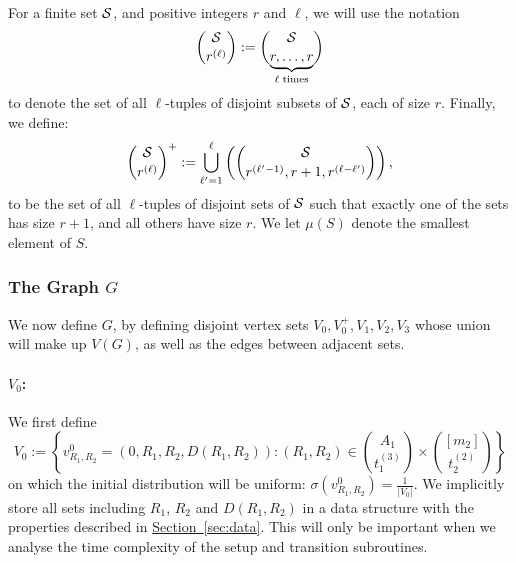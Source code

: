 \documentclass{theoretics}
\renewcommand{\sec}[1]{\hyperref[sec:#1]{Section~\ref*{sec:#1}}}
\renewcommand{\>}{\rangle}
\newcommand{\<}{\langle}
\renewcommand{\(}{\left(}
\renewcommand{\)}{\right)}
\begin{document}
For a finite set ${\cal S}$, and positive integers $r$ and $\ell$, we will use the notation 
\begin{equation}
\binom{{\cal S}}{r^{(\ell)}}:=\binom{{\cal S}}{\underbrace{r,\dots,r}_{\ell\;\mathrm{times}}}\label{eq:weird-binom}
\end{equation}
to denote the set of all $\ell$-tuples of disjoint subsets of ${\cal S}$, each of size $r$. 
Finally, we define:
\begin{equation}
{\binom{\cal S}{r^{(\ell)}}^+} := \bigcup_{\ell'=1}^{\ell} \left(\binom{\cal S}{r^{(\ell'-1)},r+1,r^{(\ell-\ell')}}\right),\label{eq:weird-binom+}
\end{equation}
to be the set of all $\ell$-tuples of disjoint sets of ${\cal S}$ such that exactly one of the sets has size $r+1$, and all others have size $r$. We let $\mu(S)$ denote the smallest element of $S$.

\subsubsection{The Graph \texorpdfstring{$G$}{G}}\label{sec:3-dist-G}

We now define $G$, by defining disjoint vertex sets $V_0,V_0^+,V_1,V_2,V_3$ whose union will make up $V(G)$, as well as the edges between adjacent sets. 

\paragraph{$V_0$:} We first define 
\begin{equation}
V_0:=\left\{v^0_{R_1,R_2}=(0,R_1,R_2,D(R_1,R_2)):(R_1,R_2)\in\binom{A_1}{t_1^{(3)}}\times\binom{[m_2]}{t_2^{(2)}}\right\}\label{eq:3-dist-V1}
\end{equation}
on which the initial distribution will be uniform: $\sigma(v^0_{R_1,R_2})=\frac{1}{|V_0|}$. We implicitly store all sets including $R_1$, $R_2$ and $D(R_1,R_2)$ in a data structure with the properties described in \sec{data}. This will only be important when we analyse the time complexity of the setup and transition subroutines. 
\end{document}
